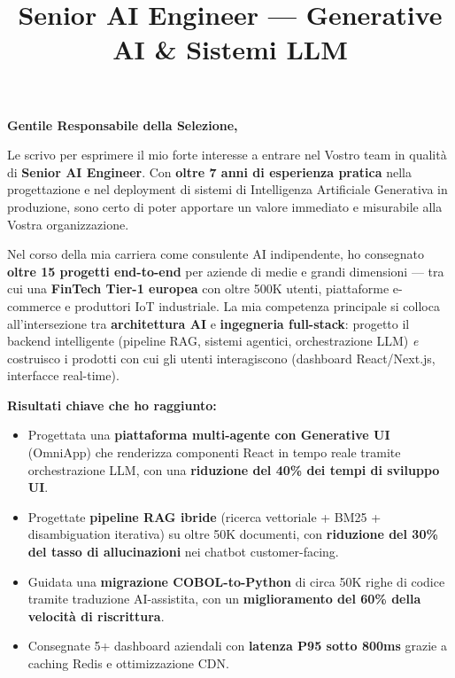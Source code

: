 \documentclass[11pt,a4paper,sans]{moderncv}
\title{Senior AI Engineer --- Generative AI \& Sistemi LLM}
\begin{document}
\makecvtitle

\vspace{-1.5em}

\section{}

\textbf{Gentile Responsabile della Selezione,}
\vspace{0.8em}

Le scrivo per esprimere il mio forte interesse a entrare nel Vostro team in qualit\`a di \textbf{Senior AI Engineer}. Con \textbf{oltre 7 anni di esperienza pratica} nella progettazione e nel deployment di sistemi di Intelligenza Artificiale Generativa in produzione, sono certo di poter apportare un valore immediato e misurabile alla Vostra organizzazione.

\vspace{0.5em}

Nel corso della mia carriera come consulente AI indipendente, ho consegnato \textbf{oltre 15 progetti end-to-end} per aziende di medie e grandi dimensioni --- tra cui una \textbf{FinTech Tier-1 europea} con oltre 500K utenti, piattaforme e-commerce e produttori IoT industriale. La mia competenza principale si colloca all'intersezione tra \textbf{architettura AI} e \textbf{ingegneria full-stack}: progetto il backend intelligente (pipeline RAG, sistemi agentici, orchestrazione LLM) \textit{e} costruisco i prodotti con cui gli utenti interagiscono (dashboard React/Next.js, interfacce real-time).

\vspace{0.5em}

\textbf{Risultati chiave che ho raggiunto:}
\vspace{0.3em}
\begin{itemize}
    \item[\textbullet] Progettata una \textbf{piattaforma multi-agente con Generative UI} (OmniApp) che renderizza componenti React in tempo reale tramite orchestrazione LLM, con una \textbf{riduzione del 40\% dei tempi di sviluppo UI}.
    \item[\textbullet] Progettate \textbf{pipeline RAG ibride} (ricerca vettoriale + BM25 + disambiguation iterativa) su oltre 50K documenti, con \textbf{riduzione del 30\% del tasso di allucinazioni} nei chatbot customer-facing.
    \item[\textbullet] Guidata una \textbf{migrazione COBOL-to-Python} di circa 50K righe di codice tramite traduzione AI-assistita, con un \textbf{miglioramento del 60\% della velocit\`a di riscrittura}.
    \item[\textbullet] Consegnate 5+ dashboard aziendali con \textbf{latenza P95 sotto 800ms} grazie a caching Redis e ottimizzazione CDN.
\end{itemize}
\end{document}
